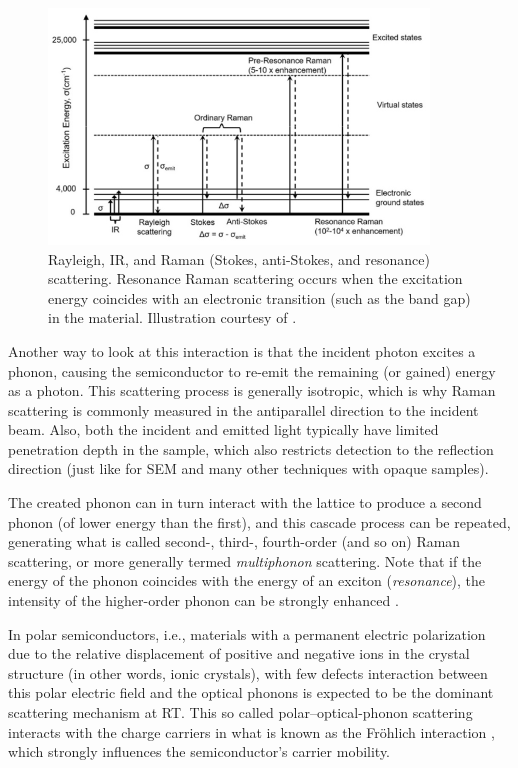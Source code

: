 \documentclass[webedition,openright,titles,swedish,english]{LuaUUThesis}\usepackage[]{graphicx}\usepackage[]{xcolor}
\newcommand{\ie}{i.e.}
\begin{document}
\begin{figure}[tbp]
\centering
\includegraphics[width=0.90\textwidth]{Raman-IR-Rayleigh-energy-levels.jpg}
\caption[Rayleigh, Raman and IR scattering]{%
   Rayleigh, \protect\gls{IR}, and Raman (Stokes, anti-Stokes, and resonance) scattering.
   Resonance Raman scattering occurs when the excitation energy coincides with
   an electronic transition (such as the band gap) in the material.
   Illustration courtesy of \textcite{Qiu2019}.
}
\label{fig:0300-vibrational-energy-levels}
\end{figure}

Another way to look at this interaction is that the incident photon excites a phonon,
causing the semiconductor to re-emit the remaining (or gained) energy as a photon.
This scattering process is generally isotropic, which is why Raman scattering is
commonly measured in the antiparallel direction to the incident beam. Also, both
the incident and emitted light typically have limited penetration depth in the sample,
which also restricts detection to the reflection direction
(just like for \gls{SEM} and many other techniques with opaque samples).

The created phonon can in turn interact with the lattice to produce a second phonon
(of lower energy than the first), and this cascade process can be repeated,
generating what is called second-, third-, fourth-order (and so on) Raman scattering,
or more generally termed \emph{multiphonon} scattering.
Note that if the energy of the phonon coincides with the energy of an exciton (\emph{resonance}),
the intensity of the higher-order phonon can be strongly enhanced \cite{Pankove1975}.

In polar semiconductors, \ie, materials with a permanent electric polarization
due to the relative displacement of positive and negative ions in the crystal
structure (in other words, ionic crystals), with few defects
interaction between this polar electric field and
the optical phonons is expected to be the dominant scattering mechanism at \gls{RT}.
This so called polar--optical-phonon scattering interacts with the charge carriers
in what is known as the Fröhlich interaction \cite[p.\,40]{Stroscio2005},
which strongly influences the semiconductor's carrier mobility.
\end{document}
